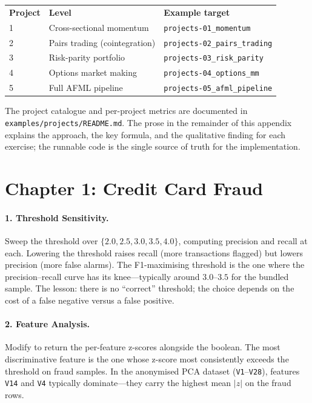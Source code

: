 \begin{center}
\begin{tabular}{lll}
\textbf{Project} & \textbf{Level} & \textbf{Example target} \\
1 & Cross-sectional momentum    & \texttt{projects-01\_momentum} \\
2 & Pairs trading (cointegration) & \texttt{projects-02\_pairs\_trading} \\
3 & Risk-parity portfolio        & \texttt{projects-03\_risk\_parity} \\
4 & Options market making        & \texttt{projects-04\_options\_mm} \\
5 & Full AFML pipeline           & \texttt{projects-05\_afml\_pipeline} \\
\end{tabular}
\end{center}

The project catalogue and per-project metrics are documented in
\texttt{examples/projects/README.md}. The prose in the remainder of
this appendix explains the approach, the key formula, and the
qualitative finding for each exercise; the runnable code is the
single source of truth for the implementation.

\section*{Chapter 1: Credit Card Fraud}

\paragraph{1. Threshold Sensitivity.}
Sweep the threshold over $\{2.0, 2.5, 3.0, 3.5, 4.0\}$, computing
precision and recall at each. Lowering the threshold raises recall
(more transactions flagged) but lowers precision (more false alarms).
The F1-maximising threshold is the one where the precision--recall
curve has its knee---typically around $3.0$--$3.5$ for the bundled
sample. The lesson: there is no ``correct'' threshold; the choice
depends on the cost of a false negative versus a false positive.

\paragraph{2. Feature Analysis.}
Modify  to return the per-feature z-scores alongside
the boolean. The most discriminative feature is the one whose
z-score most consistently exceeds the threshold on fraud samples.
In the anonymised PCA dataset (\texttt{V1}--\texttt{V28}), features
\texttt{V14} and \texttt{V4} typically dominate---they carry the
highest mean $|z|$ on the fraud rows.

